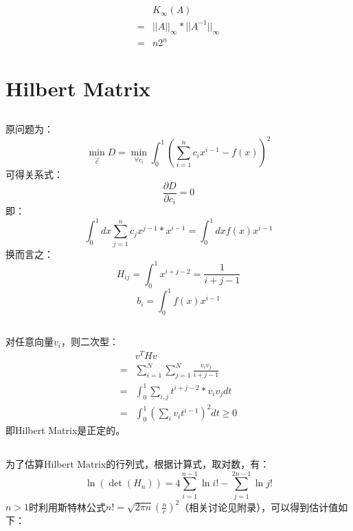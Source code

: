 \documentclass{ctexart}
\begin{document}
    \subsection{}
    \begin{align*}
        &K_\infty(A)\\
        =&||A||_\infty*||A^{-1}||_\infty\\
        =&n2^n
    \end{align*}
    \section{Hilbert Matrix}
    \subsection{}
    原问题为：
    $$\min_{\vec{c}}D=\min_{\forall c_i}{\int_0^1(\sum_{i=1}^{n}c_ix^{i-1}-f(x))^2}$$
    可得关系式：
    $$\frac{\partial D}{\partial c_i}=0$$
    即：
    $$\int_0^1dx\sum_{j=1}^{n}c_jx^{j-1}*x^{i-1}=\int_0^1dxf(x)x^{i-1}$$
    换而言之：
    $$H_{ij}=\int_0^1x^{i+j-2}=\frac{1}{i+j-1}$$
    $$b_i=\int_0^1f(x)x^{i-1}$$
    \subsection{}
    对任意向量$v_i$，则二次型：
    \begin{align*}
        &v^THv\\
        =&\sum_{i=1}^{N}\sum_{j=1}^{N}{\frac{v_iv_j}{i+j-1}}\\
        =&\int_0^1\sum_{i,j}t^{i+j-2}*v_iv_jdt\\
        =&\int_0^1(\sum_{i}{v_it^{i-1}})^2dt\geq0
    \end{align*}
    即Hilbert Matrix是正定的。
    \subsection{}
    为了估算Hilbert Matrix的行列式，根据计算式，取对数，有：
    $$\ln{(\det{(H_n)})}=4\sum_{i=1}^{n-1}{\ln{i!}}-\sum_{j=1}^{2n-1}{\ln{j!}}$$
    $n>1$时利用斯特林公式$n!=\sqrt{2\pi n}{(\frac{n}{e})^2}$（相关讨论见附录），可以得到估计值如下：
    
\end{document}
